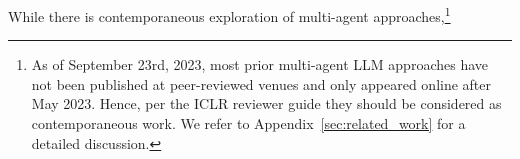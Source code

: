 While there is contemporaneous %
exploration of multi-agent approaches,\footnote{As of September 23rd, 2023, most prior multi-agent LLM approaches have not been published at peer-reviewed venues and only appeared online after May 2023. Hence, per the ICLR reviewer guide they should be considered as contemporaneous work.
We refer to Appendix~\ref{sec:related_work} for a detailed discussion.}
